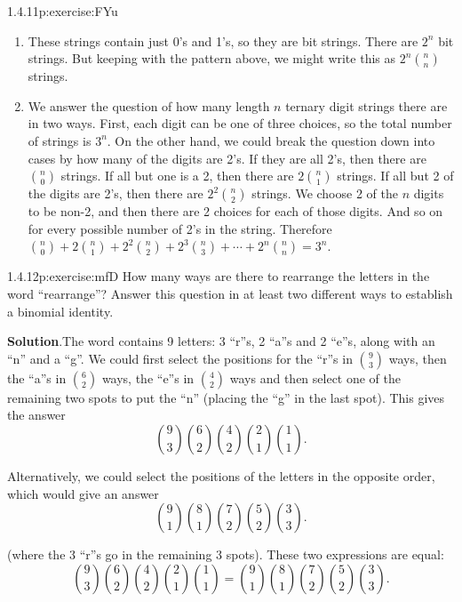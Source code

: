 \documentclass[twoside,11pt,]{book}
\newcommand{\blocktitlefont}{\relax}
\numberwithin{equation}{chapter}
\begin{document}
\begin{divisionsolution}{1.4.11}{}{p:exercise:FYu}
\begin{enumerate}[label=(\alph*)]
\item{}These strings contain just 0's and 1's, so they are bit strings. There are \(2^n\) bit strings. But keeping with the pattern above, we might write this as \(2^n {n \choose n}\) strings.%
\item{}We answer the question of how many length \(n\) ternary digit strings there are in two ways. First, each digit can be one of three choices, so the total number of strings is \(3^n\). On the other hand, we could break the question down into cases by how many of the digits are 2's. If they are all 2's, then there are \({n \choose 0}\) strings. If all but one is a 2, then there are \(2{n \choose 1}\) strings. If all but 2 of the digits are 2's, then there are \(2^2{n \choose 2}\) strings. We choose 2 of the \(n\) digits to be non-2, and then there are 2 choices for each of those digits. And so on for every possible number of 2's in the string. Therefore \({n \choose 0} + 2{n \choose 1} + 2^2{n \choose 2} + 2^3{n \choose 3} + \cdots + 2^n{n \choose n} = 3^n\).%
\end{enumerate}
%
\end{divisionsolution}%
\begin{divisionsolution}{1.4.12}{}{p:exercise:mfD}%
How many ways are there to rearrange the letters in the word ``rearrange''? Answer this question in at least two different ways to establish a binomial identity.%
\par\smallskip%
\noindent\textbf{\blocktitlefont Solution}.\quad{}The word contains 9 letters: 3 ``r''s, 2 ``a''s and 2 ``e''s, along with an ``n'' and a ``g''. We could first select the positions for the ``r''s in \({9 \choose 3}\) ways, then the ``a''s in \({6 \choose 2}\) ways, the ``e''s in \({4 \choose 2}\) ways and then select one of the remaining two spots to put the ``n'' (placing the ``g'' in the last spot). This gives the answer%
\begin{equation*}
{9 \choose 3}{6 \choose 2}{4 \choose 2}{2\choose 1}{1\choose 1}\text{.}
\end{equation*}
%
\par
Alternatively, we could select the positions of the letters in the opposite order, which would give an answer%
\begin{equation*}
{9 \choose 1}{8\choose 1}{7 \choose 2}{5\choose 2}{3\choose 3}\text{.}
\end{equation*}
%
\par
(where the 3 ``r''s go in the remaining 3 spots). These two expressions are equal:%
\begin{equation*}
{9 \choose 3}{6 \choose 2}{4 \choose 2}{2\choose 1}{1\choose 1} = {9 \choose 1}{8\choose 1}{7 \choose 2}{5\choose 2}{3\choose 3}\text{.}
\end{equation*}
%
\end{divisionsolution}%
\end{document}
